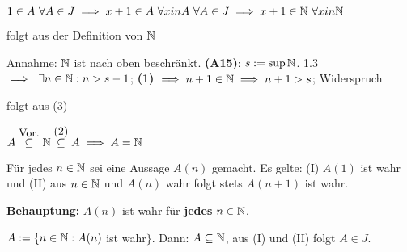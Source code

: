 \documentclass[a4paper,oneside,DIV15,BCOR12mm]{scrbook}
\begin{document}
\begin{beweis}
\begin{liste}
\item $1 \in A \ \forall A \in J \implies x + 1 \in A \ \forall x in A\ \forall A \in J \implies x+1 \in \mathbb{N}\ \forall x in \mathbb{N}$
\item folgt aus der Definition von $\mathbb{N}$
\item Annahme: $\mathbb{N}$ ist nach oben beschränkt. \textbf{(A15)}: $s := \sup{\ensuremath{\mathbb{N}}}$. 1.3 $\implies \ \exists n \in\mathbb{N}: n > s - 1$; \textbf{(1)} $\implies n+1 \in \mathbb{N} \implies n+1 > s$; Widerspruch
\item folgt aus (3)
\item $A \stackrel{\mbox{Vor.}}{\subseteq} \mathbb{N} \stackrel{\mbox{(2)}}{\subseteq} A \implies A = \mathbb{N}$
\end{liste}
\end{beweis}

\begin{satz}

Für jedes $n \in \mathbb{N}$ sei eine Aussage $A(n)$ gemacht. Es gelte: (I) $A(1)$ ist wahr und (II) aus $n \in \mathbb{N}$ und $A(n)$ wahr folgt stets $A(n+1)$ ist wahr.

\textbf{Behauptung:} $A(n)$ ist wahr für \textbf{jedes} $n \in \mathbb{N}$.
\end{satz}

\begin{beweis} $A := \{ n \in \mathbb{N}: A(n)$ ist wahr$\}$. Dann: $A \subseteq \mathbb{N}$, aus (I) und (II) folgt $A \in J$.
\end{beweis}
\end{document}
